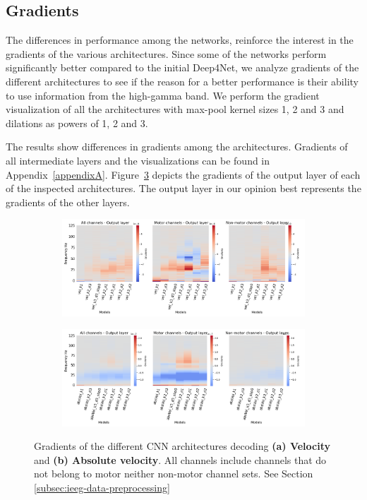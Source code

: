\subsection{Gradients}\label{subsec:gradients}
The differences in performance among the networks, reinforce the interest in the gradients of the various architectures.
Since some of the networks perform significantly better compared to the initial Deep4Net, we analyze gradients of the different architectures to see if the reason for a better performance is their ability to use information from the high-gamma band.
We perform the gradient visualization of all the architectures with max-pool kernel sizes 1, 2 and 3 and dilations as powers of 1, 2 and 3.

The results show differences in gradients among the architectures.
Gradients of all intermediate layers and the visualizations can be found in Appendix~\ref{appendixA}.
Figure~\ref{fig:last-layer-grads} depicts the gradients of the output layer of each of the inspected architectures. The output layer in our opinion best represents the gradients of the other layers.

\begin{figure}[!htpb]
\centering
\begin{subfigure}[b]{\textwidth}
   \includegraphics[width=1\linewidth]{img/ch4/vel-last-layer-grads}
   \caption{}
   \label{fig:absVel-last-layer-grads}
\end{subfigure}

\begin{subfigure}[b]{\textwidth}
   \includegraphics[width=1\linewidth]{img/ch4/absVel-last-layer-grads}
   \caption{}
   \label{fig:vel-last-layer-grads}
\end{subfigure}
\caption[Non-shifted causal prediction - gradients]{Gradients of the different CNN architectures decoding \textbf{(a) Velocity} and \textbf{(b) Absolute velocity}. All channels include channels that do not belong to motor neither non-motor channel sets. See Section \ref{subsec:ieeg-data-preprocessing}}
\label{fig:last-layer-grads}
\end{figure}

